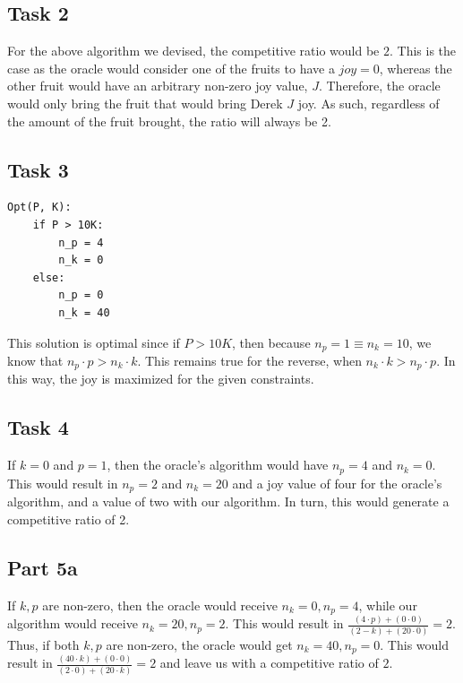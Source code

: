 \documentclass[12pt,letterpaper]{article}
\begin{document}
\subsection*{Task 2}

For the above algorithm we devised, the competitive ratio would be $2$. This is the case as the oracle would consider one of the fruits to have a $joy = 0$, whereas the other fruit would have an arbitrary non-zero joy value, $J$. Therefore, the oracle would only bring the fruit that would bring Derek $J$ joy. As such, regardless of the amount of the fruit brought, the ratio will always be 2.

\subsection*{Task 3}

\begin{lstlisting}
Opt(P, K):
    if P > 10K:
        n_p = 4
        n_k = 0
    else:
        n_p = 0
        n_k = 40
\end{lstlisting}

This solution is optimal since if $P > 10K$, then because $n_p = 1 \equiv n_k = 10$, we know that $n_p \cdot p > n_k \cdot k$. This remains true for the reverse, when $n_k \cdot k > n_p \cdot p$. In this way, the joy is maximized for the given constraints. 

\subsection*{Task 4}

If $k = 0$ and $p = 1$, then the oracle's algorithm would have $n_p = 4$ and $n_k = 0$. This would result in $n_p = 2$ and $n_k = 20$ and a joy value of four for the oracle's algorithm, and a value of two with our algorithm. In turn, this would generate a competitive ratio of 2.

\subsection*{Part 5a}

If $k, p$ are non-zero, then the oracle would receive $n_k = 0, n_p = 4$, while our algorithm would receive $n_k = 20, n_p = 2$. This would result in $\frac{(4 \cdot p) + (0 \cdot 0)}{(2 - k) + (20 \cdot 0)} = 2$. Thus, if both $k, p$ are non-zero, the oracle would get $n_k = 40, n_p = 0$. This would result in $\frac{(40 \cdot k) + (0 \cdot 0)}{(2 \cdot 0) + (20 \cdot k)} = 2$ and leave us with a competitive ratio of $2$.
\end{document}
